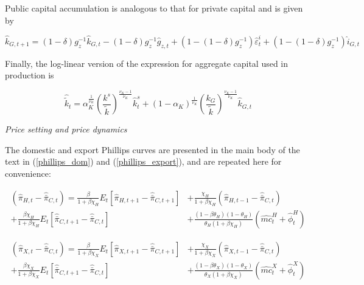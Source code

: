 \documentclass[a4paper,11pt]{article}
\numberwithin{equation}{section}
\begin{document}
	Public capital accumulation is analogous to that for private capital and is given by
	
	\begin{equation}
	\hat{k}_{G,t+1}=(1-\delta)g^{-1}_z\hat{k}_{G,t}-(1-\delta)g^{-1}_z\hat{g}_{z,t}+(1-(1-\delta)g^{-1}_z)\hat{\varepsilon}^i_t+(1-(1-\delta)g^{-1}_z)\hat{i}_{G,t}
	\end{equation}
	
	Finally, the log-linear version of the expression for aggregate capital used in production is
	
	\begin{equation}
	\hat{\tilde{k}}_t=\alpha_K^{\frac{1}{\nu_K}}\left(\frac{k^s}{\tilde{k}}\right)^{\frac{\nu_K-1}{\nu_K}}\hat{k}_t^s+(1-\alpha_K)^{\frac{1}{\nu_K}}\left(\frac{k_G}{\tilde{k}}\right)^{\frac{\nu_K-1}{\nu_K}}\hat{k}_{G,t}
	\end{equation}
	
	\vspace{8pt}
	\textit{Price setting and price dynamics}
	\vspace{8pt}
	
	The domestic and export Phillips curves are presented in the main body of the text in (\ref{phillips_dom}) and (\ref{phillips_export}), and are repeated here for convenience:
	
	\begin{equation} \label{a_phild}
	\begin{split}
	\left(\hat{\pi}_{H,t}-\hat{\bar{\pi}}_{C,t}\right)=\frac{\beta}{1+\beta\chi_H}E_t\left[\hat{\pi}_{H,t+1}-\hat{\bar{\pi}}_{C,t+1}\right]& +\frac{\chi_H}{1+\beta\chi_H}\left(\hat{\pi}_{H,t-1}-\hat{\bar{\pi}}_{C,t}\right)  \\ +\frac{\beta\chi_H}{1+\beta\chi_H}E_t\left[\hat{\bar{\pi}}_{C,t+1}-\hat{\bar{\pi}}_{C,t}\right]&+\frac{\left(1-\beta\theta_H\right)\left(1-\theta_H\right)}{\theta_H\left(1+\beta\chi_H\right)}\left(\widehat{mc}^H_t+\hat{\phi}^H_t\right)
	\end{split}
	\end{equation}
	
	\begin{equation}	 \label{a_philx}
	\begin{split}
	\left(\hat{\pi}_{X,t}-\hat{\bar{\pi}}_{C,t}\right)=\frac{\beta}{1+\beta\chi_X}E_t\left[\hat{\pi}_{X,t+1}-\hat{\bar{\pi}}_{C,t+1}\right]& +\frac{\chi_X}{1+\beta\chi_X}\left(\hat{\pi}_{X,t-1}-\hat{\bar{\pi}}_{C,t}\right)  \\ +\frac{\beta\chi_X}{1+\beta\chi_X}E_t\left[\hat{\bar{\pi}}_{C,t+1}-\hat{\bar{\pi}}_{C,t}\right]&+\frac{\left(1-\beta\theta_X\right)\left(1-\theta_X\right)}{\theta_X\left(1+\beta\chi_X\right)}\left(\widehat{mc}^X_t+\hat{\phi}^X_t\right)
	\end{split}
	\end{equation}
	
\end{document}
